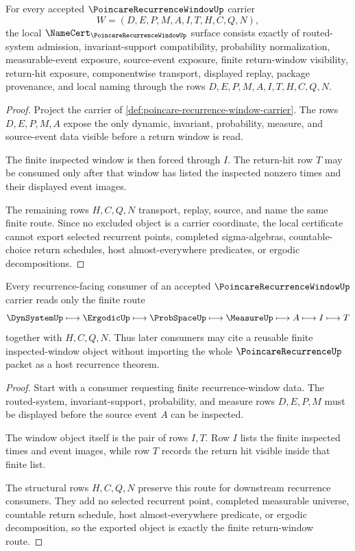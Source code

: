 \begin{theorem}
\label{thm:poincare-recurrence-window-namecert-obligations}
For every accepted $\PoincareRecurrenceWindowUp$ carrier
$$
W=(D,E,P,M,A,I,T,H,C,Q,N),
$$
the local $\NameCert_{\PoincareRecurrenceWindowUp}$ surface consists exactly of routed-system admission, invariant-support compatibility, probability normalization, measurable-event exposure, source-event exposure, finite return-window visibility, return-hit exposure, componentwise transport, displayed replay, package provenance, and local naming through the rows $D,E,P,M,A,I,T,H,C,Q,N$.
\end{theorem}
\begin{proof}
Project the carrier of \autoref{def:poincare-recurrence-window-carrier}. The rows $D,E,P,M,A$ expose the only dynamic, invariant, probability, measure, and source-event data visible before a return window is read.

The finite inspected window is then forced through $I$. The return-hit row $T$ may be consumed only after that window has listed the inspected nonzero times and their displayed event images.

The remaining rows $H,C,Q,N$ transport, replay, source, and name the same finite route. Since no excluded object is a carrier coordinate, the local certificate cannot export selected recurrent points, completed sigma-algebras, countable-choice return schedules, host almost-everywhere predicates, or ergodic decompositions.
\end{proof}

\begin{theorem}
\label{thm:poincare-recurrence-window-return-route}
Every recurrence-facing consumer of an accepted $\PoincareRecurrenceWindowUp$ carrier reads only the finite route
$$
\DynSystemUp \longmapsto \ErgodicUp \longmapsto \ProbSpaceUp \longmapsto \MeasureUp \longmapsto A \longmapsto I \longmapsto T
$$
together with $H,C,Q,N$. Thus later consumers may cite a reusable finite inspected-window object without importing the whole $\PoincareRecurrenceUp$ packet as a host recurrence theorem.
\end{theorem}
\begin{proof}
Start with a consumer requesting finite recurrence-window data. The routed-system, invariant-support, probability, and measure rows $D,E,P,M$ must be displayed before the source event $A$ can be inspected.

The window object itself is the pair of rows $I,T$. Row $I$ lists the finite inspected times and event images, while row $T$ records the return hit visible inside that finite list.

The structural rows $H,C,Q,N$ preserve this route for downstream recurrence consumers. They add no selected recurrent point, completed measurable universe, countable return schedule, host almost-everywhere predicate, or ergodic decomposition, so the exported object is exactly the finite return-window route.
\end{proof}

